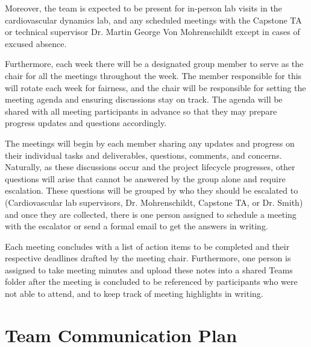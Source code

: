 \documentclass{article}
\begin{document}
\vspace{1em}

\noindent Moreover, the team is expected to be present for in-person lab visits in the cardiovascular dynamics lab, and any scheduled meetings with the Capstone TA or technical supervisor Dr. Martin George Von Mohrenschildt except in cases of excused absence. 

\vspace{1em}

\noindent Furthermore, each week there will be a designated group member to serve as the chair for all the meetings throughout the week. The member responsible for this will rotate each week for fairness, and the chair will be responsible for setting the meeting agenda and ensuring discussions stay on track. The agenda will be shared with all meeting participants in advance so that they may prepare progress updates and questions accordingly. 

\vspace{1em}

\noindent The meetings will begin by each member sharing any updates and progress on their individual tasks and deliverables, questions, comments, and concerns. Naturally, as these discussions occur and the project lifecycle progresses, other questions will arise that cannot be answered by the group alone and require escalation. These questions will be grouped by who they should be escalated to (Cardiovascular lab supervisors, Dr. Mohrenschildt, Capstone TA, or Dr. Smith) and once they are collected, there is one person assigned to schedule a meeting with the escalator or send a formal email to get the answers in writing. 

\vspace{1em}

\noindent Each meeting concludes with a list of action items to be completed and their respective deadlines drafted by the meeting chair. Furthermore, one person is assigned to take meeting minutes and upload these notes into a shared Teams folder after the meeting is concluded to be referenced by participants who were not able to attend, and to keep track of meeting highlights in writing. 


\section{Team Communication Plan}
\end{document}
